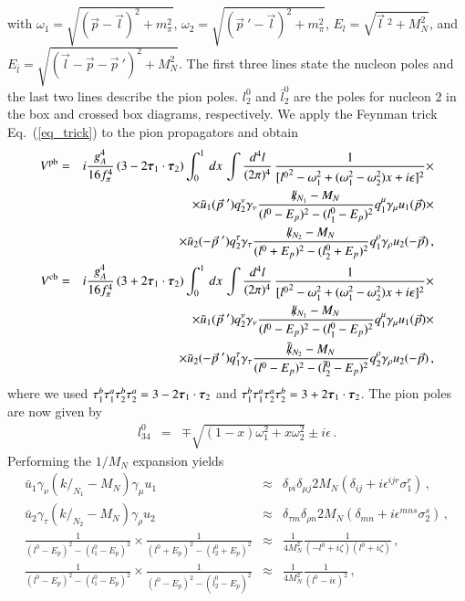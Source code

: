 \documentclass[sort&compress,preprint,3p]{elsarticle}
\begin{document}
%
with $\omega_1=\sqrt{(\vec p-\vec l)^2+m_\pi^2}$,
$\omega_2=\sqrt{({\vec p}~'-\vec{l})^2+m_\pi^2}$,
$E_l=\sqrt{{\vec l}~^2+M_N^2}$, and
$E_{\bar l}=\sqrt{(\vec l-\vec p-{\vec p}~')^2+M_N^2}$.
The first three lines state the nucleon poles
and the last two lines describe the pion poles.
$l^0_2$ and $\bar l^0_2$ are the poles for nucleon $2$ in the box and crossed box
diagrams, respectively. 
We apply the Feynman trick Eq.~(\ref{eq_trick})
to the pion propagators and obtain
%
\begin{eqnarray}
V^{\rm pb} &=& i \frac{g_A^4}{16 f_\pi^4} \,
(3-2 \mbox{\boldmath $\tau$}_1 \cdot \mbox{\boldmath $\tau$}_2 )
\int_0^1\, dx\,\int \frac{d^4 l}{(2\pi)^4} \,
\frac{1}{[{l^0}^2 - \omega_1^2 +(\omega_1^2-\omega_2^2)x+i\epsilon]^2}
\times \nonumber \\ && \times
\bar{u}_1 ({\vec p}~') q^\nu_2 \gamma_\nu  
\frac{\slash \! \! \! k_{N_1}  - M_N}{(l^0-E_p)^2-(l^0_1-E_p)^2}
q_1^\mu \gamma_\mu  
u_1 (\vec{p})
\times \nonumber \\ && \times
\bar{u}_2 (-{\vec p}~') q_2^\tau \gamma_\tau  
\frac{\slash \! \! \! k_{N_2}  - M_N}{(l^0+E_p)^2-(l^0_2+E_p)^2}
q_1^\rho \gamma_\rho  
u_2 (-\vec{p})
\,,
\\
V^{\rm cb} &=& i \frac{g_A^4}{16 f_\pi^4} \,
(3+2 \mbox{\boldmath $\tau$}_1 \cdot \mbox{\boldmath $\tau$}_2 )
\int_0^1\, dx\,\int \frac{d^4 l}{(2\pi)^4} \,
\frac{1}{[{l^0}^2 - \omega_1^2 +(\omega_1^2-\omega_2^2)x+i\epsilon]^2}
\times \nonumber \\ && \times
\bar{u}_1 ({\vec p}~') q^\nu_2 \gamma_\nu  
\frac{\slash \! \! \! k_{N_1}  - M_N}{(l^0-E_p)^2-(l^0_1-E_p)^2}
q_1^\mu \gamma_\mu  
u_1 (\vec{p})
\times \nonumber \\ && \times
\bar{u}_2 (-{\vec p}~') q_1^\tau \gamma_\tau  
\frac{\slash \! \! \! \bar k_{N_2}  - M_N}{(l^0-E_p)^2-(\bar l^0_2-E_p)^2}
q_2^\rho \gamma_\rho  
u_2 (-\vec{p})
\,,
\end{eqnarray}
%
where we used 
$\tau_1^b\tau_1^a\tau_2^b\tau_2^a=
3-2 \mbox{\boldmath $\tau$}_1 \cdot \mbox{\boldmath $\tau$}_2$ and
$\tau_1^b\tau_1^a\tau_2^a\tau_2^b=
3+2 \mbox{\boldmath $\tau$}_1 \cdot \mbox{\boldmath $\tau$}_2$.
The pion poles are now given by
%
\begin{eqnarray}
	l^0_{34} &=& \mp \sqrt{(1-x)\omega_1^2+x\omega_2^2} \pm i \epsilon
\,.
\end{eqnarray}
%
Performing the $1/M_N$ expansion yields
\begin{eqnarray}
\bar{u}_1 \gamma_\nu
(k  \!\!\!\slash_{N_1} - M_N)
\gamma_\mu  u_1
& \approx &
\delta_{\nu i} \delta_{\mu j} 2 M_N (\delta_{ij}
+ i \epsilon^{ijr} \sigma_1^r)
\,,
\\
\bar{u}_2 \gamma_\tau
(k  \!\!\!\slash_{N_2} - M_N)
\gamma_\rho  u_2
& \approx &
\delta_{\tau m} \delta_{\rho n} 2 M_N (\delta_{mn}
+ i \epsilon^{mns} \sigma_2^s)
\,,
\\
\frac{1}{(l^0-E_p)^2-(l^0_1-E_p)^2} \times
\frac{1}{(l^0+E_p)^2-(l^0_2+E_p)^2} & \approx &
\frac{1}{4M_N^2} \frac{1}{(-l^0+i\zeta)(l^0+i\zeta)}
\,,
\\
\frac{1}{(l^0-E_p)^2-(l^0_1-E_p)^2} \times
\frac{1}{(l^0-E_p)^2-(\bar l^0_2-E_p)^2} & \approx &
\frac{1}{4M_N^2} \frac{1}{(l^0-i\epsilon)^2}
\,,
\end{eqnarray}
\end{document}
